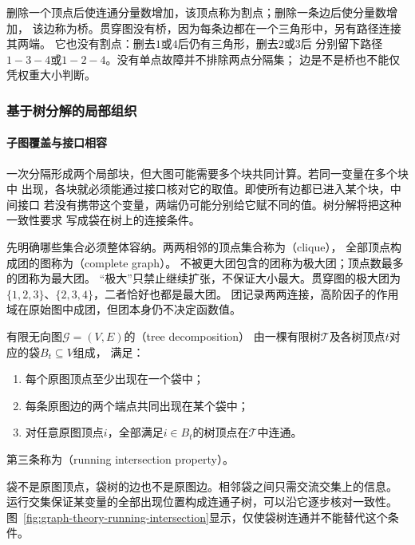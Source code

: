 删除一个顶点后使连通分量数增加，该顶点称为割点；删除一条边后使分量数增加，
该边称为桥。贯穿图没有桥，因为每条边都在一个三角形中，另有路径连接其两端。
它也没有割点：删去\(1\)或\(4\)后仍有三角形，删去\(2\)或\(3\)后
分别留下路径\(1-3-4\)或\(1-2-4\)。没有单点故障并不排除两点分隔集；
边是不是桥也不能仅凭权重大小判断。

\subsubsection{基于树分解的局部组织}
\label{sec:graph-theory-tree-decomposition}

\paragraph{子图覆盖与接口相容}

一次分隔形成两个局部块，但大图可能需要多个块共同计算。若同一变量在多个块中
出现，各块就必须能通过接口核对它的取值。即使所有边都已进入某个块，中间接口
若没有携带这个变量，两端仍可能分别给它赋不同的值。树分解将把这种一致性要求
写成袋在树上的连接条件。

先明确哪些集合必须整体容纳。两两相邻的顶点集合称为（clique），
全部顶点构成团的图称为（complete graph）。
不被更大团包含的团称为极大团；顶点数最多的团称为最大团。
“极大”只禁止继续扩张，不保证大小最大。贯穿图的极大团为
\(\{1,2,3\}\)、\(\{2,3,4\}\)，二者恰好也都是最大团。
团记录两两连接，高阶因子的作用域在原始图中成团，但团本身仍不决定函数值。

\begin{definition}[树分解]
  \label{def:graph-theory-tree-decomposition}
  有限无向图\(\mathcal G=(V,E)\)的（tree decomposition）
  由一棵有限树\(\mathcal T\)及各树顶点\(t\)对应的袋\(B_t\subseteq V\)组成，
  满足：
  \begin{enumerate}
    \item 每个原图顶点至少出现在一个袋中；
    \item 每条原图边的两个端点共同出现在某个袋中；
    \item 对任意原图顶点\(i\)，全部满足\(i\in B_t\)的树顶点在\(\mathcal T\)中连通。
  \end{enumerate}
  第三条称为（running intersection property）。
\end{definition}

袋不是原图顶点，袋树的边也不是原图边。相邻袋之间只需交流交集上的信息。
运行交集保证某变量的全部出现位置构成连通子树，可以沿它逐步核对一致性。
图~\ref{fig:graph-theory-running-intersection}显示，仅使袋树连通并不能替代这个条件。

